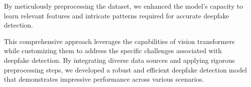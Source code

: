 \noindent By meticulously preprocessing the dataset, we enhanced the model's capacity to learn relevant features and intricate patterns required for accurate deepfake detection.

\noindent This comprehensive approach leverages the capabilities of vision transformers while customizing them to address the specific challenges associated with deepfake detection. By integrating diverse data sources and applying rigorous preprocessing steps, we developed a robust and efficient deepfake detection model that demonstrates impressive performance across various scenarios.



